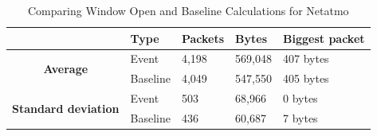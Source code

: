 \begin{table}[H]
    \centering
    \caption{Comparing Window Open and Baseline Calculations for Netatmo}
    \begin{tabular}{c|l|l|l|l|}
        \cline{2-5}
        \multicolumn{1}{l|}{}                                              & \textbf{Type} & \textbf{Packets} & \textbf{Bytes} & \textbf{Biggest packet} \\ \hline
        \multicolumn{1}{|c|}{\multirow{2}{*}{\textbf{Average}}}            & Event         & 4,198            & 569,048        & 407 bytes               \\ \cline{2-5} 
        \multicolumn{1}{|c|}{}                                             & Baseline      & 4,049            & 547,550        & 405 bytes                \\ \hline
        \multicolumn{1}{|c|}{\multirow{2}{*}{\textbf{Standard deviation}}} & Event         & 503              & 68,966         & 0 bytes                 \\ \cline{2-5} 
        \multicolumn{1}{|c|}{}                                             & Baseline      & 436              & 60,687         & 7 bytes               \\ \hline          
    \end{tabular}
    \label{tab:NetatmoComparingBaselineAndWindowCalculations}
\end{table}

